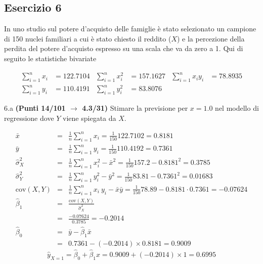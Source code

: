 \documentclass[
  11pt,
]{book}
\theoremstyle{mytheoremstyle}
\theoremstyle{mydefstyle}
\newenvironment{sol}
  {
  \begin{tcolorbox}[enhanced,breakable,arc=0.1mm,boxrule=1pt,colback=white,colframe=iblue,
  title=\bf \fontfamily{lmss}\selectfont \hspace{.5 cm} Soluzione,drop fuzzy shadow]

}{
\end{tcolorbox}
  }
\begin{document}
\subsection{Esercizio 6}\label{esercizio-6-9}

In uno studio sul potere d'acquisto delle famiglie è stato selezionato un campione di 150 nuclei familiari
a cui è stato chiesto il reddito (\(X\)) e la percezione della perdita del potere d'acquisto espresso su una scala che va da zero a 1.
Qui di seguito le statistiche bivariate

\begin{align*}
  \sum_{i=1}^n x_i &= 122.7104 &\sum_{i=1}^n x_i^2 &= 157.1627 &\sum_{i=1}^n x_i y_i &= 78.8935\\
  \sum_{i=1}^n y_i &= 110.4191 & \sum_{i=1}^n y_i^2 &= 83.8076 &
\end{align*}

6.a \textbf{(Punti 14/101 \(\rightarrow\) 4.3/31)} Stimare la previsione per \(x=1.0\) nel modello di regressione dove \(Y\) viene spiegata da \(X\).

\begin{sol}
\begin{eqnarray*}
           \bar x &=&\frac 1 n\sum_{i=1}^n x_i = \frac {1}{ 150 }  122.7102 =  0.8181 \\
           \bar y &=&\frac 1 n\sum_{i=1}^n y_i = \frac {1}{ 150 }  110.4192 =  0.7361 \\
           \hat\sigma_X^2&=&\frac 1 n\sum_{i=1}^n x_i^2-\bar x^2=\frac {1}{ 150 }  157.2  - 0.8181 ^2= 0.3785 \\
           \hat\sigma_Y^2&=&\frac 1 n\sum_{i=1}^n y_i^2-\bar y^2=\frac {1}{ 150 }  83.81  - 0.7361 ^2= 0.01683 \\
           \text{cov}(X,Y)&=&\frac 1 n\sum_{i=1}^n x_i~y_i-\bar x\bar y=\frac {1}{ 150 }  78.89 - 0.8181 \cdot 0.7361 = -0.07624 \\
           \hat\beta_1 &=& \frac{\text{cov}(X,Y)}{\hat\sigma_X^2} \\
                    &=& \frac{ -0.07624 }{ 0.3785 }  =  -0.2014 \\
           \hat\beta_0 &=& \bar y - \hat\beta_1 \bar x\\
                    &=&  0.7361 - (-0.2014) \times  0.8181 = 0.9009 
         \end{eqnarray*}\[\hat y_{X= 1 }=\hat\beta_0+\hat\beta_1 x= 0.9009 + (-0.2014) \times 1 = 0.6995 \]

\end{sol}
\end{document}
